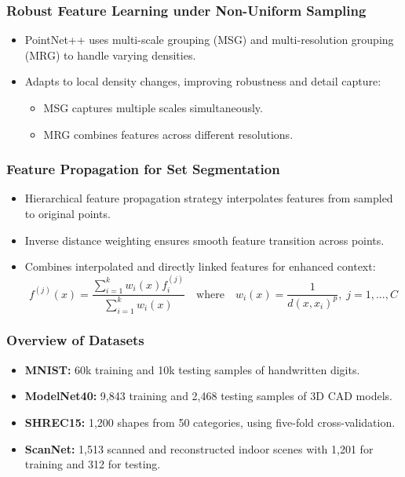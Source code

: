 \documentclass[11pt,xcolor={dvipsnames},hyperref={pdftex,pdfpagemode=UseNone,hidelinks,pdfdisplaydoctitle=true},usepdftitle=false]{beamer}
\begin{document}
\begin{frame}
\frametitle{Robust Feature Learning under Non-Uniform Sampling}
\begin{itemize}
  \item PointNet++ uses multi-scale grouping (MSG) and multi-resolution grouping (MRG) to handle varying densities.
  \item Adapts to local density changes, improving robustness and detail capture:
  \begin{itemize}
    \item MSG captures multiple scales simultaneously.
    \item MRG combines features across different resolutions.
  \end{itemize}
\end{itemize}
\end{frame}

\begin{frame}
\frametitle{Feature Propagation for Set Segmentation}
\begin{itemize}
  \item Hierarchical feature propagation strategy interpolates features from sampled to original points.
  \item Inverse distance weighting ensures smooth feature transition across points.
  \item Combines interpolated and directly linked features for enhanced context:
  \begin{equation}
    f^{(j)}(x) = \frac{\sum_{i=1}^{k}w_i (x) f_i^{(j)}}{\sum_{i=1}^k w_i (x)}
    \quad \text{where}\quad w_i(x) = \frac{1}{d(x,x_i)^p},\; j=1,...,C
  \end{equation}
\end{itemize}
\end{frame}

\begin{frame}
\frametitle{Overview of Datasets}
\begin{itemize}
    \item \textbf{MNIST:} 60k training and 10k testing samples of handwritten digits.
    \item \textbf{ModelNet40:} 9,843 training and 2,468 testing samples of 3D CAD models.
    \item \textbf{SHREC15:} 1,200 shapes from 50 categories, using five-fold cross-validation.
    \item \textbf{ScanNet:} 1,513 scanned and reconstructed indoor scenes with 1,201 for training and 312 for testing.
\end{itemize}
\end{frame}
\end{document}

